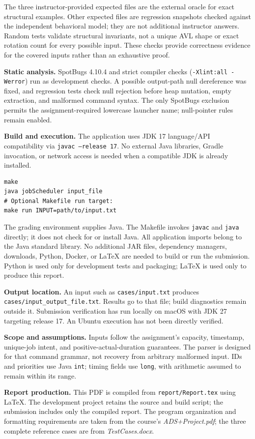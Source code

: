 \documentclass[10pt,letterpaper]{article}
\newcommand{\code}[1]{\texttt{#1}}
\begin{document}
The three instructor-provided expected files are the external oracle for exact structural examples. Other expected files are regression snapshots checked against the independent behavioral model; they are not additional instructor answers. Random tests validate structural invariants, not a unique AVL shape or exact rotation count for every possible input. These checks provide correctness evidence for the covered inputs rather than an exhaustive proof.

\textbf{Static analysis.} SpotBugs 4.10.4 and strict compiler checks (\code{-Xlint:all -Werror}) run as development checks. A possible output-path null dereference was fixed, and regression tests check null rejection before heap mutation, empty extraction, and malformed command syntax. The only SpotBugs exclusion permits the assignment-required lowercase launcher name; null-pointer rules remain enabled.

\textbf{Build and execution.} The application uses JDK 17 language/API compatibility via \code{javac --release 17}. No external Java libraries, Gradle invocation, or network access is needed when a compatible JDK is already installed.
\begin{lstlisting}
make
java jobScheduler input_file
# Optional Makefile run target:
make run INPUT=path/to/input.txt
\end{lstlisting}
The grading environment supplies Java. The Makefile invokes \code{javac} and \code{java} directly; it does not check for or install Java. All application imports belong to the Java standard library. No additional JAR files, dependency managers, downloads, Python, Docker, or LaTeX are needed to build or run the submission. Python is used only for development tests and packaging; LaTeX is used only to produce this report.

\textbf{Output location.} An input such as \code{cases/input.txt} produces \code{cases/input\_output\_file.txt}. Results go to that file; build diagnostics remain outside it. Submission verification has run locally on macOS with JDK 27 targeting release 17. An Ubuntu execution has not been directly verified.

\textbf{Scope and assumptions.} Inputs follow the assignment's capacity, timestamp, unique-job intent, and positive-actual-duration guarantees. The parser is designed for that command grammar, not recovery from arbitrary malformed input. IDs and priorities use Java \code{int}; timing fields use \code{long}, with arithmetic assumed to remain within its range.

\textbf{Report production.} This PDF is compiled from \code{report/Report.tex} using LaTeX. The development project retains the source and build script; the submission includes only the compiled report. The program organization and formatting requirements are taken from the course's \emph{ADS+Project.pdf}; the three complete reference cases are from \emph{TestCases.docx}.
\end{document}
